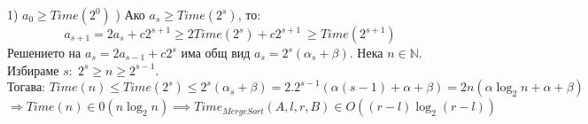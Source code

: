 \documentclass{article}
\renewcommand{\\}{\newline}
\newcommand{\tv}{\textbf{Твърдение:\;}}
\newcommand{\N}{\mathbb{N}}
\newcommand{\doc}{\textbf{Доказателство: }}
\begin{document}
1) \(a_0 \geq Time(2^0)\) \\
2) Ако  \(a_s \geq Time(2^s)\), то:
\[a_{s+1} = 2a_s + c2^{s+1} \geq 2Time(2^s) + c2^{s+1}\ \geq Time(2^{s+1})\]
Решението на \(a_s = 2a_{s-1} + c2^s\) има общ вид \(a_s = 2^s(\alpha_s+\beta)\).\\\\
Нека \(n \in \N\). Избираме \(s:\; 2^s \geq n \geq 2^{s-1}\). \\\\
\[\text{Тогава: } Time(n) \leq Time(2^s) \leq 2^s(\alpha_s + \beta) = 2.2^{s-1}(\alpha(s-1)+\alpha+\beta) = 2n(\alpha \log_2 n + \alpha + \beta)\]
\(\Rightarrow Time(n) \in 0(n\log_2 n) \implies Time_{MergeSort}(A, l, r, B) \in O\left((r - l)\log_2 (r-l)\right)\) \\\\

\end{document}
